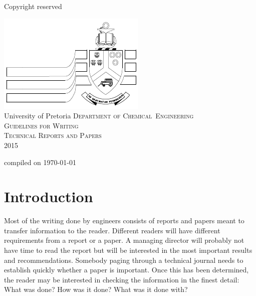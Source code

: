 \documentclass[a5paper, 10pt]{article}
\begin{document}
\begin{titlepage}
  \begin{centering}
    \begin{flushright}Copyright reserved\end{flushright}
    \vfil
    \includegraphics{uplogo}\\
    \textsf{University of Pretoria}
    \vfil
    {\Huge\scshape
    Department of Chemical~Engineering\\
    \vfil
    Guidelines for Writing \\ Technical Reports and Papers\\}
  \vfil
  2015 \\
  \vfil
  \begin{flushright}\small{compiled on \today}\end{flushright}
\end{centering}

\end{titlepage}

\pagestyle{empty}

\cleardoublepage

\setcounter{page}{1}
\pagestyle{plain}
\tableofcontents
\newpage

\pagestyle{empty}
\cleardoublepage
\setcounter{page}{1}
\pagestyle{plain}

\section{Introduction}
\label{cha:introduction}
Most of the writing done by engineers consists of reports and papers
meant to transfer information to the reader.  Different readers will
have different requirements from a report or a paper.  A managing
director will probably not have time to read the report but will be
interested in the most important results and recommendations.
Somebody paging through a technical journal needs to establish quickly
whether a paper is important.  Once this has been determined, the
reader may be interested in checking the information in the finest
detail: What was done?  How was it done?  What was it done with?
\end{document}
